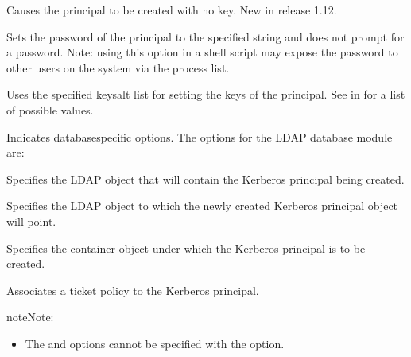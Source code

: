 \documentclass[letterpaper,10pt,english]{sphinxmanual}
\begin{document}
\begin{description}
\sphinxAtStartPar
Causes the principal to be created with no key.  New in release
1.12.

\sphinxAtStartPar
Sets the password of the principal to the specified string and
does not prompt for a password.  Note: using this option in a
shell script may expose the password to other users on the system
via the process list.

\sphinxAtStartPar
Uses the specified keysalt list for setting the keys of the
principal.  See {\hyperref[\detokenize{admin/conf_files/kdc_conf:keysalt-lists}]{}} in {\hyperref[\detokenize{admin/conf_files/kdc_conf:kdc-conf-5}]{}} for a
list of possible values.

\sphinxAtStartPar
Indicates database\sphinxhyphen{}specific options.  The options for the LDAP
database module are:
\begin{description}
\sphinxAtStartPar
Specifies the LDAP object that will contain the Kerberos
principal being created.

\sphinxAtStartPar
Specifies the LDAP object to which the newly created Kerberos
principal object will point.

\sphinxAtStartPar
Specifies the container object under which the Kerberos
principal is to be created.

\sphinxAtStartPar
Associates a ticket policy to the Kerberos principal.

\end{description}

\begin{sphinxadmonition}{note}{Note:}\begin{itemize}
\item {} 
\sphinxAtStartPar
The  and  options cannot be
specified with the  option.


\end{itemize}
\end{sphinxadmonition}
\end{description}
\end{document}
